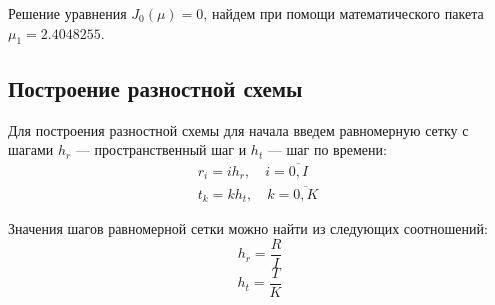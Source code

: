 \documentclass[a4paper,12pt,russian, fleqn]{extreport}
\begin{document}
	Решение уравнения $J_0(\mu) = 0$, найдем при помощи математического пакета $\mu_1 = 2.4048255$.
	\subsection{Построение разностной схемы}
	
	Для построения разностной схемы для начала введем равномерную сетку с шагами $h_r$ --- пространственный шаг и $h_t$ --- шаг по времени:	
	\begin{equation}
	\begin{array}{l}
	r_i = ih_r, \quad i = \overline{0,I} \quad \\                         
	t_k = kh_t, \quad k = \overline{0,K}
	\end{array}
	\label{eq:grid}
	\end{equation}
	
	Значения шагов равномерной сетки можно найти из следующих соотношений:	
	\begin{equation*}
	h_r = \dfrac{R}{I}
	\end{equation*}	
	\begin{equation*}
	h_t = \dfrac{T}{K}
	\end{equation*}
\end{document}
